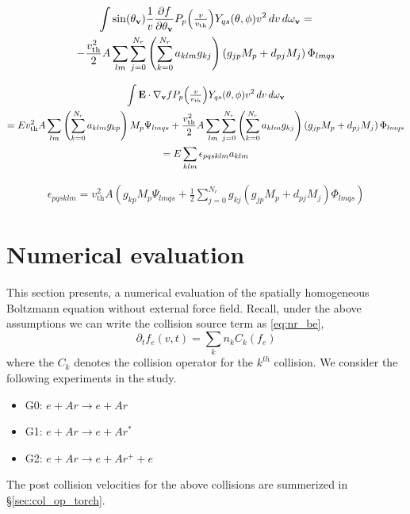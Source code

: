 \documentclass{article}
\newcommand{\myint}{\int\limits}
\newcommand{\diff}[1]{\, d#1}
\newcommand{\vect}[1]{\mathbf{#1}}
\newcommand{\of}[1]{\mleft( #1 \mright)}
\newcommand{\vth}{v_\textrm{th}}
\begin{document}
\begin{multline*}
\myint \sin\of{\theta_\vect{v}} \frac{1}{v} \frac{\partial f}{\partial \vect{\theta}_{\vect{v}}} P_p\of{\textstyle\frac{v}{\vth}} Y_{qs}\of{\theta,\phi} v^2 \diff{v} \diff{\omega_{\vect{v}}}
=
\\
-
\frac{\vth^2}{2}
A \sum_{lm} \sum_{j=0}^{N_r} \left(\sum_{k=0}^{N_r} a_{klm} g_{kj} \right) 
\left(
g_{jp} M_p
+
d_{pj} M_j
\right)
\Phi_{lmqs}
\end{multline*}

\begin{multline*}
\myint \vect{E}\cdot \nabla_{\vect{v}} f P_p\of{\textstyle\frac{v}{\vth}} Y_{qs}\of{\theta,\phi} v^2 \diff{v} \diff{\omega_{\vect{v}}}
\\
=
E
\vth^2
A \sum_{lm} \left(\sum_{k=0}^{N_r} a_{klm} g_{kp} \right) 
M_{p}
\Psi_{lmqs}
+
\frac{\vth^2}{2}
A \sum_{lm} \sum_{j=0}^{N_r} \left(\sum_{k=0}^{N_r} a_{klm} g_{kj} \right) 
\left(
g_{jp} M_p
+
d_{pj} M_j
\right)
\Phi_{lmqs}
\\
=
E
\sum_{klm}
\epsilon_{pqsklm} a_{klm}
\end{multline*}

\begin{align*}
\epsilon_{pqsklm} =
\vth^2 A 
\left(
g_{kp} M_{p} \Psi_{lmqs}
+
\frac{1}{2}
\sum_{j=0}^{N_r} g_{kj} 
\left(
g_{jp} M_p
+
d_{pj} M_j
\right)
\Phi_{lmqs}
\right)
\end{align*}

\newpage
\section{Numerical evaluation}
This section presents, a numerical evaluation of the spatially homogeneous Boltzmann equation without external force field. Recall, under the above assumptions we can write the collision source term as \eqref{eq:nr_be}, 
\begin{equation}
	\partial_t f_e(v,t) = \sum_{k} n_k C_k(f_e) \label{eq:nr_be}
\end{equation} where the $C_k$ denotes the collision operator for the $k^{th}$ collision. We consider the following experiments in the study. 
\begin{itemize}
\item G0: $e + Ar \rightarrow e + Ar $ 
\item G1: $e + Ar \rightarrow e + Ar^*$
\item G2: $e + Ar \rightarrow e + Ar^+ + e$ 
\end{itemize} The post collision velocities for the above collisions are summerized in \S\ref{sec:col_op_torch}.
\end{document}
